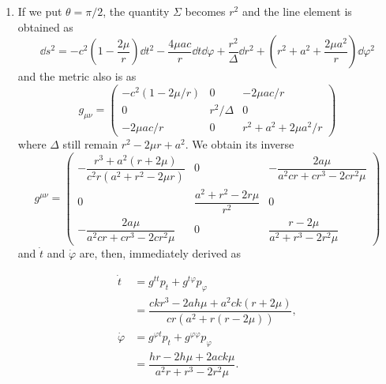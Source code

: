 \documentclass[a4paper,pdftex,10pt]{article}
\begin{document}
\maketitle

\begin{enumerate}
  \item
        If we put $\theta=\pi/2$, the quantity $\Sigma$ becomes $r^2$ and the line element is obtained as
        \begin{equation}
          \dd s^2
          =
          -
          c^2
          \left( 1-\frac{2\mu}{r} \right)\dd t^2
          -
          \frac{4\mu ac}{r}\dd t\dd \varphi
          +
          \frac{r^2}{\Delta}\dd r^2
          +
          \left(
          r^2+a^2+\frac{2\mu a^2}{r}
          \right)
          \dd\varphi^2
        \end{equation}
        and the metric also is as
        \begin{equation}
          g_{\mu\nu}
          =
          \begin{pmatrix}
            -c^2(1-2\mu/r) & 0          & -2\mu ac/r            \\
            0              & r^2/\Delta & 0                     \\
            -2\mu ac/r     & 0          & r^2 + a^2 +2\mu a^2/r
          \end{pmatrix}
        \end{equation}
        where $\Delta$ still remain $r^2-2\mu r+a^2$. We obtain its inverse
        \begin{equation}
          g^{\mu\nu}
          =
          \begin{pmatrix}
            -\dfrac{r^3+a^2(r+2\mu)}{c^2 r(a^2+r^2-2\mu r)} & 0                          & -\dfrac{2a\mu}{a^2 cr+cr^3-2cr^2\mu} \\
            0                                               & \dfrac{a^2+r^2-2r\mu}{r^2} & 0                                    \\
            -\dfrac{2a\mu}{a^2cr+cr^3-2cr^2\mu}             & 0                          & \dfrac{r-2\mu}{a^2+r^3-2r^2\mu}
          \end{pmatrix}
          \label{eqn:inverse_metric}
        \end{equation}
        and $\dot{t}$ and $\dot{\varphi}$ are, then, immediately derived as
        \begin{graybox}
          \vspace*{-12pt}
          \begin{align}
            \dot{t}
             & =
            g^{tt}p_{t}+g^{t\varphi}p_{\varphi}
            \nonumber
            \\
             & =
            \dfrac{ckr^3-2ah\mu+a^2 ck(r+2\mu)}{cr(a^2+r(r-2\mu))}
            ,
            \\
            \dot{\varphi}
             & =
            g^{\varphi t}p_{t}+g^{\varphi\varphi}p_{\varphi}
            \nonumber
            \\
             & =
            \dfrac{hr-2h\mu+2ack\mu}{a^2r+r^3-2r^2\mu}
            .
          \end{align}
        \end{graybox}



\end{enumerate}
\end{document}
